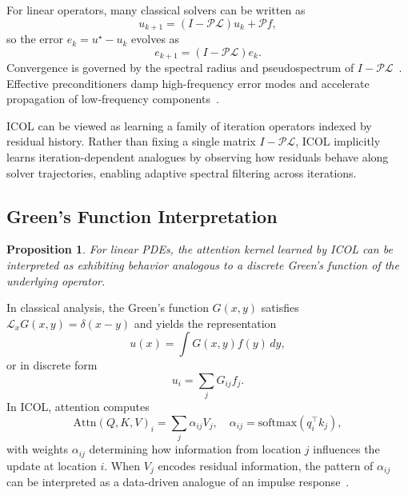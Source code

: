 \documentclass{article}
\newtheorem{proposition}{Proposition}
\begin{document}
For linear operators, many classical solvers can be written as
\begin{equation}
u_{k+1} = (I - \mathcal{P}\mathcal{L})u_k + \mathcal{P}f,
\end{equation}
so the error $e_k = u^\star - u_k$ evolves as
\begin{equation}
e_{k+1} = (I - \mathcal{P}\mathcal{L}) e_k.
\end{equation}
Convergence is governed by the spectral radius and pseudospectrum of $I - \mathcal{P}\mathcal{L}$~\cite{saad2003iterative,trefethen1997pseudospectra}. Effective preconditioners damp high-frequency error modes and accelerate propagation of low-frequency components~\cite{briggs2000multigrid}.

ICOL can be viewed as learning a family of iteration operators indexed by residual history. Rather than fixing a single matrix $I - \mathcal{P}\mathcal{L}$, ICOL implicitly learns iteration-dependent analogues by observing how residuals behave along solver trajectories, enabling adaptive spectral filtering across iterations.

\subsection{Green's Function Interpretation}

\begin{proposition}
For linear PDEs, the attention kernel learned by ICOL can be interpreted as exhibiting behavior analogous to a discrete Green's function of the underlying operator.
\end{proposition}

In classical analysis, the Green's function $G(x,y)$ satisfies $\mathcal{L}_x G(x,y) = \delta(x-y)$ and yields the representation
\begin{equation}
u(x) = \int G(x,y) f(y)\,dy,
\end{equation}
or in discrete form
\begin{equation}
u_i = \sum_j G_{ij} f_j.
\end{equation}
In ICOL, attention computes
\begin{equation}
\mathrm{Attn}(Q,K,V)_i = \sum_j \alpha_{ij} V_j,
\quad \alpha_{ij} = \mathrm{softmax}(q_i^\top k_j),
\end{equation}
with weights $\alpha_{ij}$ determining how information from location $j$ influences the update at location $i$. When $V_j$ encodes residual information, the pattern of $\alpha_{ij}$ can be interpreted as a data-driven analogue of an impulse response~\cite{kutz2017deep}.
\end{document}

